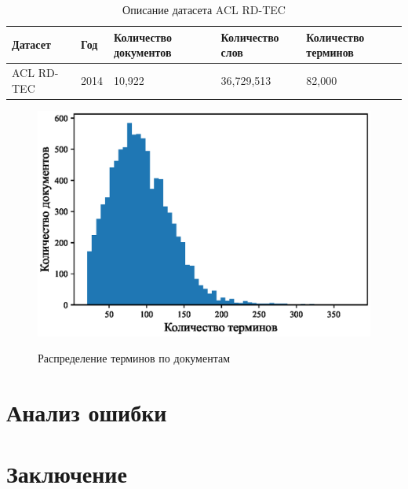 \documentclass[a4paper, 12pt]{article}
\begin{document}
 \begin{table}[t]%
    \caption{Описание датасета ACL RD-TEC}
    \label{table:Dataset}
    \centering\medskip%
    \begin{tabular}{| p{75 pt} | p{50 pt} | p{70 pt} | p{70 pt} | p{70 pt} |}
    \hline
        Датасет
            & Год
            & Количество документов
            & Количество слов
            & Количество терминов \\ \hline
        ACL RD-TEC
            & 2014
            & 10,922
            & 36,729,513
            & 82,000 \\ \hline
    \hline
    \end{tabular}
\end{table}

\begin{figure}[!ht]
    {\includegraphics[scale = 1.2]{Pictures/Statistics.eps}}
    \caption{Распределение терминов по документам}
    \label{fg:Dataset}
\end{figure}


\section{Анализ ошибки}

\section{Заключение}



\end{document}

